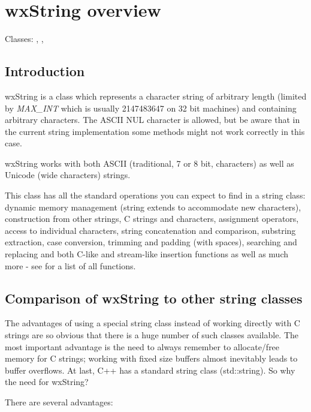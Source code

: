 \section{wxString overview}\label{wxstringoverview}

Classes: , , 

\subsection{Introduction}\label{introductiontowxstring}

wxString is a class which represents a character string of arbitrary length (limited by 
{\it MAX\_INT} which is usually 2147483647 on 32 bit machines) and containing
arbitrary characters. The ASCII NUL character is allowed, but be aware that
in the current string implementation some methods might not work correctly
in this case.

wxString works with both ASCII (traditional, 7 or 8 bit, characters) as well as
Unicode (wide characters) strings.

This class has all the standard operations you can expect to find in a string class:
dynamic memory management (string extends to accommodate new characters),
construction from other strings, C strings and characters, assignment operators,
access to individual characters, string concatenation and comparison, substring
extraction, case conversion, trimming and padding (with spaces), searching and
replacing and both C-like  and stream-like
insertion functions as well as much more - see  
for a list of all functions.

\subsection{Comparison of wxString to other string classes}\label{otherstringclasses}

The advantages of using a special string class instead of working directly with
C strings are so obvious that there is a huge number of such classes available.
The most important advantage is the need to always
remember to allocate/free memory for C strings; working with fixed size buffers almost
inevitably leads to buffer overflows. At last, C++ has a standard string class
(std::string). So why the need for wxString?

There are several advantages:

